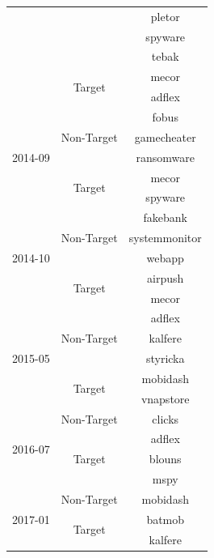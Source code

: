 \documentclass[lettersize,journal]{IEEEtran}
\begin{document}
\begin{itemize}[leftmargin=*]
\begin{table}[ht!]
\begin{center}
\begin{tabular}{ccc}
				&	& pletor \\
				&	& spyware \\
				&   & tebak   \\ \cline{2-3}
				& \multirow{2}{*}{Target} 	& mecor \\
				&   & adflex  \\
				\midrule
				\multirow{5}{*}{2014-09} & \multirow{3}{*}{Non-Target} 	& fobus \\ 
				&	& gamecheater \\
				&   & ransomware  \\ \cline{2-3}
				& \multirow{2}{*}{Target} 	& mecor \\
				&   & spyware  \\
				\midrule
				\multirow{5}{*}{2014-10} & \multirow{3}{*}{Non-Target} 	& fakebank \\ 
				&	& systemmonitor \\
				&   & webapp  \\ \cline{2-3}
				& \multirow{2}{*}{Target} 	& airpush \\
				&   & mecor  \\
				\midrule
				\multirow{5}{*}{2015-05} & \multirow{3}{*}{Non-Target} 	& adflex \\ 
				&	& kalfere \\
				&   & styricka  \\ \cline{2-3}
				& \multirow{2}{*}{Target} 	& mobidash \\
				&   & vnapstore  \\
				\midrule
				\multirow{4}{*}{2016-07} & \multirow{1}{*}{Non-Target} 	& clicks \\  \cline{2-3}
				& \multirow{3}{*}{Target} 	& adflex \\
				&   & blouns  \\
				&   & mspy    \\
				\midrule
				\multirow{3}{*}{2017-01} & \multirow{1}{*}{Non-Target} 	& mobidash \\  \cline{2-3}
				& \multirow{2}{*}{Target} 	& batmob \\
				&   & kalfere  \\
				\midrule
			\end{tabular}
		\end{center}
	\end{table}
	

\end{itemize}
\end{document}
